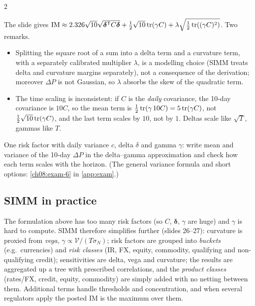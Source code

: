 \begin{paracol}{2}
\begin{coursenote}
The slide gives $\mathrm{IM}\approx2.326\sqrt{10}\sqrt{\bm\delta^{\mathsf T} C\bm\delta}+\frac12\sqrt{10}\operatorname{tr}(\gamma C)
+\lambda\sqrt{\frac12\operatorname{tr}((\gamma C)^2)}$. Two remarks.
\begin{itemize}
  \item Splitting the square root of a sum into a delta term and a
      curvature term, with a separately calibrated multiplier $\lambda$, is a modelling choice (SIMM treats delta and
      curvature margins separately), not a consequence of the derivation; moreover $\Delta P$ is not Gaussian, so
      $\lambda$ absorbs the skew of the quadratic term.
  \item The time scaling is inconsistent: if $C$ is the \emph{daily}
      covariance, the 10-day covariance is $10C$, so the mean term is $\frac12\operatorname{tr}(\gamma\,10C)=5\operatorname{tr}(\gamma C)$, not
      $\frac12\sqrt{10}\operatorname{tr}(\gamma C)$, and the last term scales by $10$, not by $1$. Deltas scale like $\sqrt T$, gammas
      like $T$.
\end{itemize}
\end{coursenote}

\begin{exercise}\label{ch08:exam-6-short}
One risk factor with daily variance $c$, delta $\delta$ and gamma $\gamma$: write mean and variance of the 10-day $\Delta P$ in the delta--gamma approximation and check how each term scales with the horizon. (The general variance formula and short options: \cref{ch08:exam-6} in \cref{app:exam}.)
\end{exercise}

\subsection{SIMM in practice}
The formulation above has too many risk factors (so $C$, $\bm\delta$, $\gamma$ are huge) and $\gamma$ is hard to
compute. SIMM therefore simplifies further (slides 26--27): curvature is proxied from \emph{vega},
$\gamma\propto\mathcal V/(T\sigma_N)$; risk factors are grouped into \emph{buckets} (e.g.\ currencies) and \emph{risk
classes} (IR, FX, equity, commodity, qualifying and non-qualifying credit); sensitivities are delta, vega and
curvature; the results are aggregated up a tree with prescribed correlations, and the \emph{product classes}
(rates/FX, credit, equity, commodity) are simply added with no netting between them. Additional terms handle
thresholds and concentration, and when several regulators apply the posted IM is the maximum over them.


\end{paracol}
